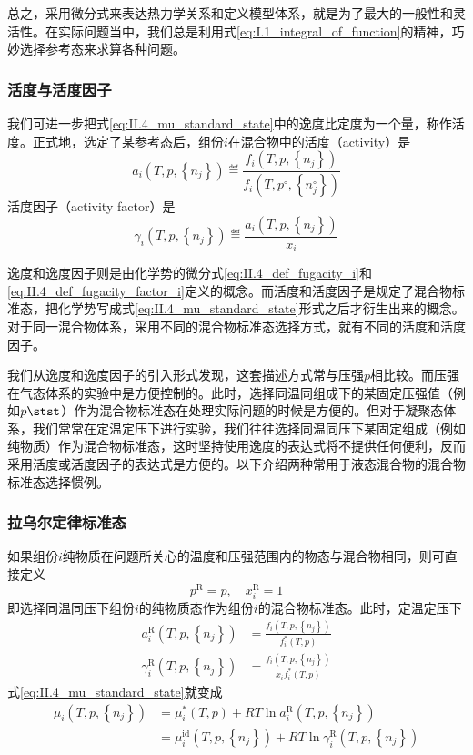 \documentclass[main.tex]{subfiles}
\begin{document}
总之，采用微分式来表达热力学关系和定义模型体系，就是为了最大的一般性和灵活性。在实际问题当中，我们总是利用式\eqref{eq:I.1_integral_of_function}的精神，巧妙选择参考态来求算各种问题。

\subsubsection{活度与活度因子}
我们可进一步把式\eqref{eq:II.4_mu_standard_state}中的逸度比定度为一个量，称作活度。正式地，选定了某参考态后，组份$i$在混合物中的活度（activity）是
\begin{equation}
    a_i\left(T,p,\left\{n_j\right\}\right)\eqdef\frac{f_i\left(T,p,\left\{n_j\right\}\right)}{f_i\left(T,p^\circ,\left\{n_j^\circ\right\}\right)}
\end{equation}
活度因子（activity factor）是
\begin{equation}
    \gamma_i\left(T,p,\left\{n_j\right\}\right)\eqdef\frac{a_i\left(T,p,\left\{n_j\right\}\right)}{x_i}
\end{equation}

逸度和逸度因子则是由化学势的微分式\eqref{eq:II.4_def_fugacity_i}和\eqref{eq:II.4_def_fugacity_factor_i}定义的概念。而活度和活度因子是规定了混合物标准态，把化学势写成式\eqref{eq:II.4_mu_standard_state}形式之后才衍生出来的概念。对于同一混合物体系，采用不同的混合物标准态选择方式，就有不同的活度和活度因子。

我们从逸度和逸度因子的引入形式发现，这套描述方式常与压强$p$相比较。而压强在气态体系的实验中是方便控制的。此时，选择同温同组成下的某固定压强值（例如$p\stst$）作为混合物标准态在处理实际问题的时候是方便的。但对于凝聚态体系，我们常常在定温定压下进行实验，我们往往选择同温同压下某固定组成（例如纯物质）作为混合物标准态，这时坚持使用逸度的表达式将不提供任何便利，反而采用活度或活度因子的表达式是方便的。以下介绍两种常用于液态混合物的混合物标准态选择惯例。

\subsubsection{拉乌尔定律标准态}
如果组份$i$纯物质在问题所关心的温度和压强范围内的物态与混合物相同，则可直接定义
\[p^\text{R}=p,\quad x^\text{R}_i=1\]
即选择同温同压下组份$i$的纯物质态作为组份$i$的混合物标准态。此时，定温定压下
\begin{align*}
    a_i^\text{R}\left(T,p,\left\{n_j\right\}\right)      & =\frac{f_i\left(T,p,\left\{n_j\right\}\right)}{f_i^*\left(T,p\right)}    \\
    \gamma_i^\text{R}\left(T,p,\left\{n_j\right\}\right) & =\frac{f_i\left(T,p,\left\{n_j\right\}\right)}{x_if_i^*\left(T,p\right)}
\end{align*}
式\eqref{eq:II.4_mu_standard_state}就变成
\begin{align}
    \mu_i\left(T,p,\left\{n_j\right\}\right) & =\mu_i^*\left(T,p\right)+RT\ln a_i^\text{R}\left(T,p,\left\{n_j\right\}\right)\label{eq:II.4_Raoult_standard_state_activity}                                       \\
                                             & =\mu_i^\text{id}\left(T,p,\left\{n_j\right\}\right)+RT\ln\gamma_i^\text{R}\left(T,p,\left\{n_j\right\}\right)\label{eq:II.4_Raoult_standard_state_activity_factor}
\end{align}
\end{document}
